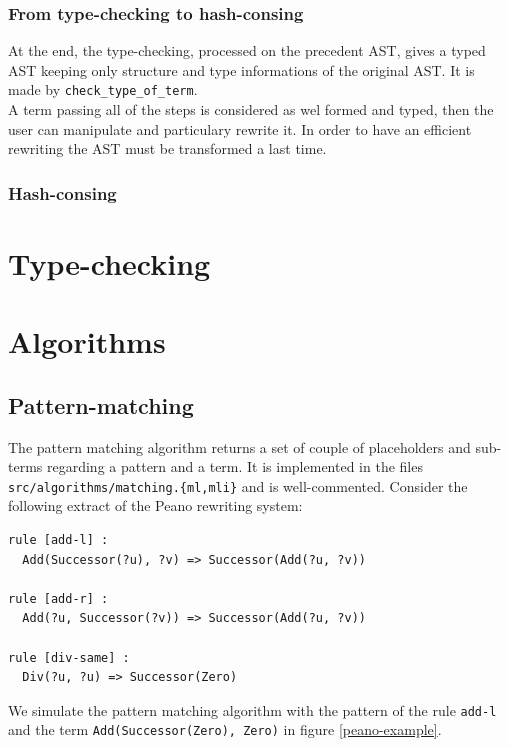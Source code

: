 \documentclass[12pt,a4paper]{article}
\begin{document}
\subsubsection{From type-checking to hash-consing}
At the end, the type-checking, processed on the precedent AST, gives a
typed AST keeping only structure and type informations of the original AST.
It is made by \verb?check_type_of_term?.
\\
A term passing all of the steps is considered as wel formed and typed, then
the user can manipulate and particulary rewrite it. In order to have an
efficient rewriting the AST must be transformed a last time.

\subsubsection{Hash-consing}
\label{data-term-hash-consing}


\section{Type-checking}
\label{typechecking}

\section{Algorithms}
\label{algorithms}

\subsection{Pattern-matching}
\label{pattern-matching}

The pattern matching algorithm returns a set of couple of placeholders and sub-terms regarding a pattern and a term. It is implemented in the files \texttt{src/algorithms/matching.\{ml,mli\}} and is well-commented. Consider the following extract of the Peano rewriting system:
\begin{lstlisting}
rule [add-l] :
  Add(Successor(?u), ?v) => Successor(Add(?u, ?v))

rule [add-r] :
  Add(?u, Successor(?v)) => Successor(Add(?u, ?v))

rule [div-same] :
  Div(?u, ?u) => Successor(Zero)
\end{lstlisting}

We simulate the pattern matching algorithm with the pattern of the rule \texttt{add-l} and the term \texttt{Add(Successor(Zero), Zero)} in figure \ref{peano-example}.
\end{document}
